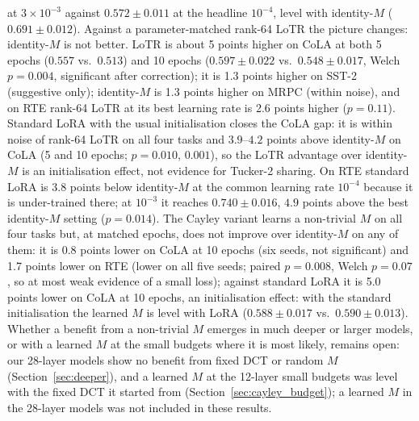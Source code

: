 \documentclass{article}
\theoremstyle{plain}
\begin{document}
at $3\times10^{-3}$ against $0.572\pm0.011$ at the headline $10^{-4}$, level with identity-$M$ ($0.691\pm0.012$).
Against a parameter-matched rank-64 LoTR the picture changes: identity-$M$ is not better.
LoTR is about 5 points higher on CoLA at both 5 epochs ($0.557$ vs.\ $0.513$) and 10 epochs ($0.597\pm0.022$ vs.\ $0.548\pm0.017$,
Welch $p=0.004$, significant after correction); it is 1.3 points higher on SST-2 (suggestive only);
identity-$M$ is 1.3 points higher on MRPC (within noise), and on RTE rank-64 LoTR at its best learning rate is 2.6 points higher ($p=0.11$).
Standard LoRA with the usual initialisation closes the CoLA gap: it is within noise of rank-64 LoTR on all four tasks and $3.9$--$4.2$ points above identity-$M$ on CoLA
(5 and 10 epochs; $p=0.010$, $0.001$), so the LoTR advantage over identity-$M$ is an initialisation effect, not evidence for Tucker-2 sharing.
On RTE standard LoRA is $3.8$ points below identity-$M$ at the common learning rate $10^{-4}$ because it is under-trained there; at $10^{-3}$ it reaches $0.740\pm0.016$, $4.9$ points above the best identity-$M$ setting ($p=0.014$).
The Cayley variant learns a non-trivial $M$ on all four tasks but, at matched epochs, does not improve over
identity-$M$ on any of them: it is 0.8 points lower on CoLA at 10 epochs (six seeds, not significant) and
1.7 points lower on RTE (lower on all five seeds; paired $p=0.008$, Welch $p=0.07$, so at most weak evidence of a small loss);
against standard LoRA it is 5.0 points lower on CoLA at 10 epochs, an initialisation effect: with the standard initialisation the learned $M$ is level with LoRA ($0.588\pm0.017$ vs.\ $0.590\pm0.013$).
Whether a benefit from a non-trivial $M$ emerges in much deeper or larger models, or with a learned $M$ at the small budgets where it is most likely, remains open:
our 28-layer models show no benefit from fixed DCT or random $M$ (Section~\ref{sec:deeper}), and a learned $M$ at the 12-layer small budgets was level with the fixed DCT it started from (Section~\ref{sec:cayley_budget}); a learned $M$ in the 28-layer models was not included in these results.
\end{document}
